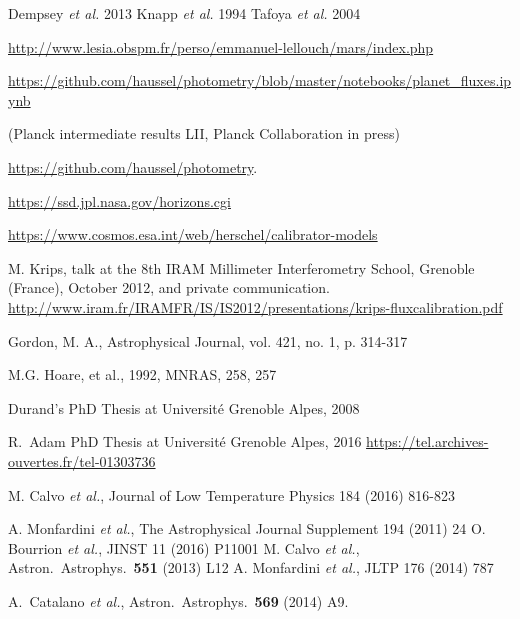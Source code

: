 \begin{thebibliography}{99}
 Dempsey {\it et al.} 2013
 Knapp {\it et al.} 1994
 Tafoya {\it et al.} 2004

\url{http://www.lesia.obspm.fr/perso/emmanuel-lellouch/mars/index.php}

\url{https://github.com/haussel/photometry/blob/master/notebooks/planet_fluxes.ipynb}

(Planck intermediate results LII, Planck
Collaboration in press)

\url{https://github.com/haussel/photometry}.

\url{https://ssd.jpl.nasa.gov/horizons.cgi}

\url{https://www.cosmos.esa.int/web/herschel/calibrator-models}

 M. Krips, talk at the 8th 
IRAM Millimeter Interferometry School, Grenoble (France),  October 2012, and
private communication.\\
\url{http://www.iram.fr/IRAMFR/IS/IS2012/presentations/krips-fluxcalibration.pdf}

 Gordon, M. A., Astrophysical Journal, vol. 421, no. 1, p. 314-317

 M.G. Hoare, et al., 1992, MNRAS, 258, 257

 Durand's PhD Thesis at
Universit\'e Grenoble Alpes, 2008

 R.~Adam PhD Thesis at
  Universit\'e Grenoble Alpes, 2016
\url{https://tel.archives-ouvertes.fr/tel-01303736}

M. Calvo {\it et al.},  
Journal of Low Temperature Physics 184 (2016) 816-823 
 
    A. Monfardini {\it et al.}, The Astrophysical Journal Supplement 194 (2011)  24 
    O. Bourrion {\it et al.}, JINST 11 (2016) P11001 
    M. Calvo {\it et al.}, Astron.\ Astrophys.\  {\bf 551} (2013) L12
 A. Monfardini {\it et al.}, JLTP 176 (2014) 787
    
 
  A.~Catalano {\it et al.},
  Astron.\ Astrophys.\  {\bf 569} (2014) A9.
  

\end{thebibliography}
